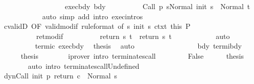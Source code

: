 \begin{isabellebody}
\ \ \ \ \ \ \isamarkupfalse%
\ {\isacharminus}\isanewline
\ \ \ \ \ \ \ \ \isamarkupfalse%
\ exec{\isacharunderscore}bdy\ bdy\isanewline
\ \ \ \ \ \ \ \ \isamarkupfalse%
\ {\isachardoublequoteopen}{\isasymGamma}{\isasymturnstile}{\isasymlangle}Call\ {\isacharparenleft}p\ s{\isacharparenright}{\isacharcomma}Normal\ {\isacharparenleft}init\ s{\isacharparenright}{\isasymrangle}\ {\isasymRightarrow}\ Normal\ t{\isachardoublequoteclose}\isanewline
\ \ \ \ \ \ \ \ \ \ \isamarkupfalse%
\ {\isacharparenleft}auto\ simp\ add{\isacharcolon}\ intro{\isacharcolon}\ exec{\isachardot}intros{\isacharparenright}\isanewline
\ \ \ \ \ \ \ \ \isamarkupfalse%
\ cvalidD\ {\isacharbrackleft}OF\ valid{\isacharunderscore}modif\ {\isacharbrackleft}rule{\isacharunderscore}format{\isacharcomma}\ of\ s\ {\isachardoublequoteopen}init\ s{\isachardoublequoteclose}{\isacharbrackright}\ ctxt{\isacharprime}\ this{\isacharbrackright}\ P\ \isanewline
\ \ \ \ \ \ \ \ \ \ ret{\isacharunderscore}modif\isanewline
\ \ \ \ \ \ \ \ \isamarkupfalse%
\ {\isachardoublequoteopen}return{\isacharprime}\ s\ t\ {\isacharequal}\ return\ s\ t{\isachardoublequoteclose}\isanewline
\ \ \ \ \ \ \ \ \ \ \isamarkupfalse%
\ auto\isanewline
\ \ \ \ \ \ \ \ \isamarkupfalse%
\ termi{\isacharunderscore}c\ exec{\isacharunderscore}bdy\ \isamarkupfalse%
\ {\isacharquery}thesis\ \isamarkupfalse%
\ auto\isanewline
\ \ \ \ \ \ \isamarkupfalse%
\isanewline
\ \ \ \ \isacommand{{\isacharbraceright}}\isamarkupfalse%
\isanewline
\ \ \ \ \isamarkupfalse%
\ bdy\ termi{\isacharunderscore}bdy\isanewline
\ \ \ \ \isamarkupfalse%
\ {\isacharquery}thesis\isanewline
\ \ \ \ \ \ \isamarkupfalse%
\ {\isacharparenleft}iprover\ intro{\isacharcolon}\ terminates{\isacharunderscore}call{\isacharparenright}\isanewline
\ \ \isamarkupfalse%
\isanewline
\ \ \ \ \isamarkupfalse%
\ False\isanewline
\ \ \ \ \isamarkupfalse%
\ {\isacharquery}thesis\isanewline
\ \ \ \ \ \ \isamarkupfalse%
\ {\isacharparenleft}auto\ intro{\isacharcolon}\ terminates{\isacharunderscore}callUndefined{\isacharparenright}\isanewline
\ \ \isamarkupfalse%
\isanewline
\ \ \isamarkupfalse%
\ {\isachardoublequoteopen}{\isasymGamma}{\isasymturnstile}dynCall\ init\ p\ return\ c\ {\isasymdown}\ Normal\ s{\isachardoublequoteclose}\isanewline
\ \ \ \ \isamarkupfalse%

\end{isabellebody}
